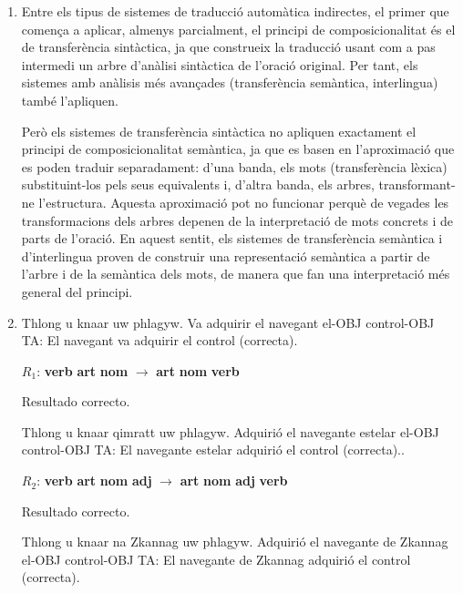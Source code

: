 \begin{enumerate}
\item Entre els tipus de sistemes de traducció automàtica indirectes, el primer que comença a aplicar, almenys parcialment, el principi de composicionalitat és el de transferència sintàctica, ja que construeix la traducció usant com a pas intermedi un arbre d'anàlisi sintàctica de l'oració original. Per tant, els sistemes amb anàlisis més avançades (transferència semàntica, interlingua) també l'apliquen. 

Però els sistemes de transferència sintàctica no apliquen exactament el principi de composicionalitat semàntica, ja que es basen en l'aproximació que es poden traduir separadament: d'una banda, els mots (transferència lèxica) substituint-los pels seus equivalents i, d'altra banda, els arbres, transformant-ne l'estructura. Aquesta aproximació pot no funcionar perquè de vegades les transformacions dels arbres depenen de la interpretació de mots concrets i de parts de l'oració. En aquest sentit, els sistemes de transferència semàntica i d'interlingua proven de construir una representació semàntica a partir de l'arbre i de la semàntica dels mots, de manera que fan una interpretació més general del principi. 

\item

\begin{example} \gll Thlong u knaar uw phlagyw. {Va adquirir} el navegant el-OBJ control-OBJ \glt TA: El navegant va adquirir el control (correcta). \glend

\end{example} $R_1$: \textbf{verb} \textbf{art} \textbf{nom} $\rightarrow$ \textbf{art} \textbf{nom} \textbf{verb} 

Resultado correcto. 

\begin{example} \gll Thlong u knaar qimratt uw phlagyw. {Adquirió} el navegante estelar el-OBJ control-OBJ \glt TA: El navegante estelar adquirió el control (correcta).. \glend

\end{example} $R_2$: \textbf{verb} \textbf{art} \textbf{nom} \textbf{adj} $\rightarrow$ \textbf{art} \textbf{nom} \textbf{adj} \textbf{verb} \begin{example} 

Resultado correcto. 

\gll Thlong u knaar na Zkannag uw phlagyw. {Adquirió} el navegante de Zkannag el-OBJ control-OBJ \glt TA: El navegante de Zkannag adquirió el control (correcta). \glend


\end{example}
\end{enumerate}
